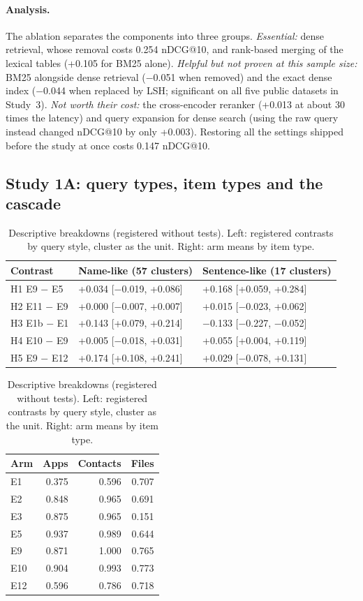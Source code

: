 \documentclass[11pt,a4paper]{article}
\makeatletter
\newcommand{\ndcg}{nDCG@10}
\makeatother
\begin{document}
\paragraph{Analysis.} The ablation separates the components into three groups. \emph{Essential:} dense retrieval, whose removal costs 0.254 \ndcg{}, and rank-based merging of the lexical tables (+0.105 for BM25 alone). \emph{Helpful but not proven at this sample size:} BM25 alongside dense retrieval ($-$0.051 when removed) and the exact dense index ($-$0.044 when replaced by LSH; significant on all five public datasets in Study~3). \emph{Not worth their cost:} the cross-encoder reranker (+0.013 at about 30 times the latency) and query expansion for dense search (using the raw query instead changed \ndcg{} by only +0.003). Restoring all the settings shipped before the study at once costs 0.147 \ndcg{}.

\subsection{Study 1A: query types, item types and the cascade}\label{sec:s1strata}

\begin{table}[tbp]
\centering\small
\caption{Descriptive breakdowns (registered without tests). Left: registered contrasts by query style, cluster as the unit. Right: arm means by item type.}
\label{tab:strata}
\begin{tabular}{lll}
\toprule
Contrast & Name-like (57 clusters) & Sentence-like (17 clusters) \\
\midrule
H1 E9 $-$ E5 & +0.034 [$-$0.019, +0.086] & +0.168 [+0.059, +0.284] \\
H2 E11 $-$ E9 & +0.000 [$-$0.007, +0.007] & +0.015 [$-$0.023, +0.062] \\
H3 E1b $-$ E1 & +0.143 [+0.079, +0.214] & $-$0.133 [$-$0.227, $-$0.052] \\
H4 E10 $-$ E9 & +0.005 [$-$0.018, +0.031] & +0.055 [+0.004, +0.119] \\
H5 E9 $-$ E12 & +0.174 [+0.108, +0.241] & +0.029 [$-$0.078, +0.131] \\
\bottomrule
\end{tabular}\hfill
\begin{tabular}{lrrr}
\toprule
Arm & Apps & Contacts & Files \\
\midrule
E1 & 0.375 & 0.596 & 0.707 \\
E2 & 0.848 & 0.965 & 0.691 \\
E3 & 0.875 & 0.965 & 0.151 \\
E5 & 0.937 & 0.989 & 0.644 \\
E9 & 0.871 & 1.000 & 0.765 \\
E10 & 0.904 & 0.993 & 0.773 \\
E12 & 0.596 & 0.786 & 0.718 \\
\bottomrule
\end{tabular}
\end{table}
\end{document}
